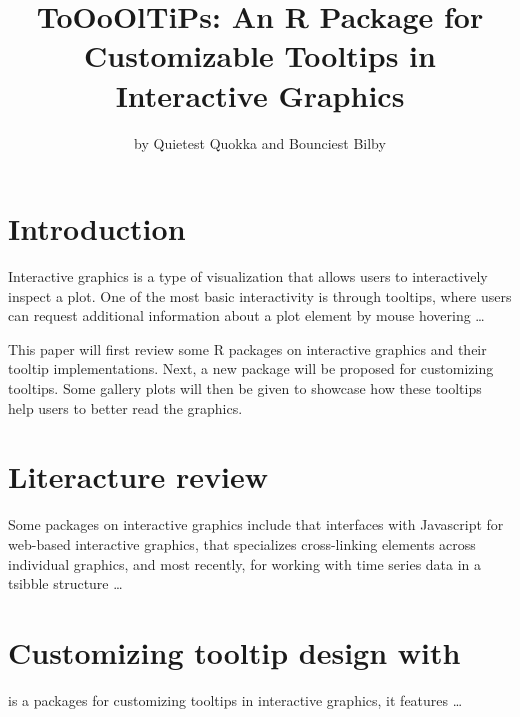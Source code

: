 \title{ToOoOlTiPs: An R Package for Customizable Tooltips in Interactive
Graphics}
\author{by Quietest Quokka and Bounciest Bilby}

\maketitle


\hypertarget{introduction}{%
\section{Introduction}\label{introduction}}

Interactive graphics is a type of visualization that allows users to
interactively inspect a plot. One of the most basic interactivity is
through tooltips, where users can request additional information about a
plot element by mouse hovering \ldots{}

This paper will first review some R packages on interactive graphics and
their tooltip implementations. Next, a new package 
will be proposed for customizing tooltips. Some gallery plots will then
be given to showcase how these tooltips help users to better read the
graphics.

\hypertarget{literacture-review}{%
\section{Literacture review}\label{literacture-review}}

Some packages on interactive graphics include 
\citep{plotly} that interfaces with Javascript for web-based interactive
graphics,  \citep{crosstalk} that specializes
cross-linking elements across individual graphics, and most recently,
 \citep{RJ-2021-050} for working with time series
data in a tsibble structure \ldots{}

\hypertarget{customizing-tooltip-design-with}{%
\section{\texorpdfstring{Customizing tooltip design with
}{Customizing tooltip design with }}\label{customizing-tooltip-design-with}}

 is a packages for customizing tooltips in interactive
graphics, it features \ldots{}

